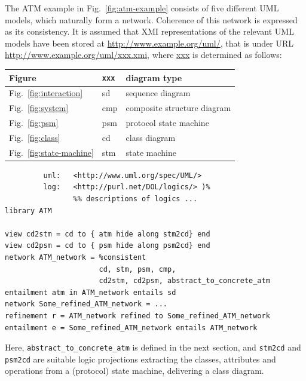 \documentclass[10pt,fleqn,final]{scrreprt}
\newenvironment{definitions}[0]{\medskip }{}
\begin{document}
\begin{definitions}
The ATM example in Fig.~\ref{fig:atm-example} consists of five different
UML models, which naturally form a network. Coherence of this network
is expressed as its consistency. 
It is assumed that XMI representations of the
relevant UML models have been stored at
\url{http://www.example.org/uml/}, that is under URL
\url{http://www.example.org/uml/xxx.xmi}, where \url{xxx} is
determined as follows:\medskip

\begin{tabular}{|l|l|l|}\hline
\textbf{Figure} & \textbf{\texttt{xxx}} & \textbf{diagram type}\\\hline
Fig.~\ref{fig:interaction} & sd & sequence diagram\\\hline
Fig.~\ref{fig:system} & cmp & composite structure diagram\\\hline
Fig.~\ref{fig:psm} & psm & protocol state machine\\\hline
Fig.~\ref{fig:class} & cd & class diagram\\\hline
Fig.~\ref{fig:state-machine} & stm & state machine\\\hline
\end{tabular}

\begin{lstlisting}[basicstyle=\ttfamily,language=dolText,morekeywords={props,ObjectProperty,Class,DisjointUnionOf,SubClassOf,Characteristics,Transitive,Asymmetric,SubPropertyOf,DisjointClasses,EquivalentTo,inverse,only,forall,iff,if,or,exists,distributed,refinement,library,via,network,entailment,entails,refined,consistent},escapechar=@,mathescape]
%prefix( :      <http://www.example.org/uml/>
         uml:   <http://www.uml.org/spec/UML/>
         log:   <http://purl.net/DOL/logics/> )%
                %% descriptions of logics ...
library ATM

view cd2stm = cd to { atm hide along stm2cd} end
view cd2psm = cd to { psm hide along psm2cd} end
network ATM_network = %consistent
                      cd, stm, psm, cmp,
                      cd2stm, cd2psm, abstract_to_concrete_atm
entailment atm in ATM_network entails sd
network Some_refined_ATM_network = ...
refinement r = ATM_network refined to Some_refined_ATM_network
entailment e = Some_refined_ATM_network entails ATM_network
\end{lstlisting}
Here, \texttt{abstract\_to\_concrete\_atm} is defined in the next
section, and \texttt{stm2cd} and \texttt{psm2cd} are suitable logic
projections extracting the classes, attributes and operations from a
(protocol) state machine, delivering a class diagram.


\end{definitions}
\end{document}
